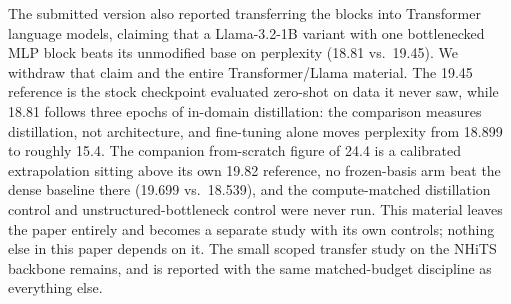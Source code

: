 The submitted version also reported transferring the blocks into Transformer
language models, claiming that a Llama-3.2-1B variant with one bottlenecked
MLP block beats its unmodified base on perplexity (18.81 vs.\ 19.45). We
withdraw that claim and the entire Transformer/Llama material. The 19.45
reference is the stock checkpoint evaluated zero-shot on data it never saw,
while 18.81 follows three epochs of in-domain distillation: the comparison
measures distillation, not architecture, and fine-tuning alone moves
perplexity from 18.899 to roughly 15.4. The companion from-scratch figure of
24.4 is a calibrated extrapolation sitting above its own 19.82 reference,
no frozen-basis arm beat the dense baseline there (19.699 vs.\ 18.539), and
the compute-matched distillation control and unstructured-bottleneck control
were never run. This material leaves the paper entirely and becomes a
separate study with its own controls; nothing else in this paper depends on
it. The small scoped transfer study on the NHiTS backbone
\citep{challu2023nhits} remains, and is reported with the same
matched-budget discipline as everything else.

